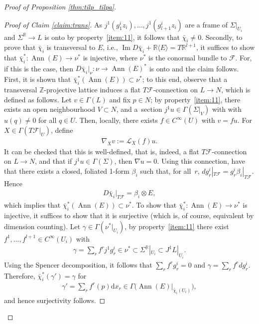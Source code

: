 \documentclass[pdftex]{sigma}
\numberwithin{equation}{section}
\DeclareMathOperator{\Ann}{Ann}
\renewcommand{\Im}{\operatorname{Im}} %
\newcommand{\de}{\mathrm{d}} %
\newcommand{\RR}{\mathbb{R}}
\newcommand{\ZZ}{\mathbb{Z}}
\begin{document}
\begin{proof}[Proof of Proposition \ref{thm:tilp_tilpa}]
\begin{proof}[Proof of Claim \ref{claim:trans}] As $j^1(g^i_1z_i),\ldots,j^1(g^i_{l+1}z_i)$ are a frame of $\Sigma|_{U_i}$ and $\Sigma^{\RR}\to L$ is onto by property~\ref{item:11}, it follows that $\bar\chi_i \neq 0$. Secondly, to prove that $\bar\chi_i$ is transversal to $E$, i.e., $\Im D\bar\chi_i + \RR \langle E \rangle=T\RR^{l+1}$, it suf\/f\/ices to show that $\bar\chi_i^*\colon \Ann(E)\to \nu^*$ is injective, where $\nu^*$ is the conormal bundle to $\mathcal{F}$. For, if this is the case, then $D\bar{\chi}_i|_{\nu} \colon \nu \to \Ann(E)^*$ is onto and the claim follows. First, it is shown that $\bar{\chi}^*_i(\Ann(E)) \subset \nu^*$; to this end, observe that a transversal $\ZZ$-projective lattice induces a f\/lat $T\mathcal{F}$-connection on $L \to N$, which is def\/ined as follows. Let $v \in \Gamma(L)$ and f\/ix $p \in N$; by property~\ref{item:11}, there exists an open neighbourhood $V \subset N$, and a~section $j^1u \in \Gamma(\Sigma|_V)$ with with $u(q) \neq 0$ for all $q \in U$. Then, locally, there exists $f \in C^{\infty}(U)$ with $v =f u$. For $X \in \Gamma(T\mathcal{F}|_U)$, def\/ine
 \begin{gather*}
 \nabla_X v := \mathcal{L}_X(f) u.
 \end{gather*}
It can be checked that this is well-def\/ined, that is, indeed, a f\/lat $T\mathcal{F}$-connection on $L \to N$, and that if $j^1u \in \Gamma(\Sigma)$, then $\nabla u =0$. Using this connection, have that there exists a closed, foliated 1-form $\beta_i$ such that, for all~$r$, $dg^i_r|_{T\mathcal{F}}=g^i_r\beta_i|_{T\mathcal{F}}$. Hence
 \begin{gather}\label{eq:euler}
 D\bar\chi_i|_{T\mathcal{F}}=\beta_i \otimes E,
 \end{gather}
which implies that $\bar\chi_i^*(\Ann(E))\subset \nu^*$. To show that $\bar\chi_i^*\colon \Ann(E)\to \nu^*$ is injective, it suf\/f\/ices to show that it is surjective (which is, of course, equivalent by dimension counting). Let $\gamma \in \Gamma(\nu^*|_{U_i})$, by property~\ref{item:11} there exist
 $f^1,\ldots,f^{l+1}\in C^\infty(U_i)$ with
 \begin{gather*}
 \gamma=\sum_rf^rj^1g^i_r\in \nu^*\subset \Sigma^\RR|_{U_i}\subset J^1L|_{U_i}.
 \end{gather*}
Using the Spencer decomposition, it follows that $\sum_rf^rg^i_r=0$ and $\gamma=\sum_rf^rdg^i_r$. Therefore, $\bar\chi_i^*(\gamma')=\gamma$ for
 \begin{gather*}
 \gamma'=\sum\limits_rf^r(p)\de x_r\in \Gamma\big(\Ann(E)|_{\bar\chi_i(U_i)}\big),
 \end{gather*}
 and hence surjectivity follows.
 \end{proof}


\end{proof}
\end{document}
